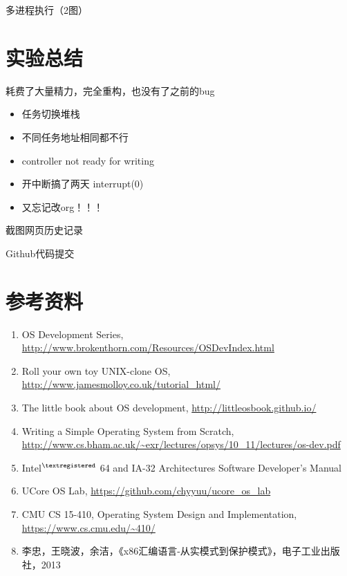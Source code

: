 \documentclass[logo,reportComp]{thesis}
\begin{document}
多进程执行（2图）

\section{实验总结}
耗费了大量精力，完全重构，也没有了之前的bug

\begin{itemize}
\item 任务切换堆栈
\item 不同任务地址相同都不行
\item controller not ready for writing
\item 开中断搞了两天 interrupt(0)
\item 又忘记改org！！！
\end{itemize}

截图网页历史记录

Github代码提交

\section{参考资料}
\begin{enumerate}
	\item OS Development Series, \url{http://www.brokenthorn.com/Resources/OSDevIndex.html}
	\item Roll your own toy UNIX-clone OS, \url{http://www.jamesmolloy.co.uk/tutorial_html/}
	\item The little book about OS development, \url{http://littleosbook.github.io/}
	\item Writing a Simple Operating System from Scratch, \url{http://www.cs.bham.ac.uk/~exr/lectures/opsys/10_11/lectures/os-dev.pdf}
	\item Intel$^{\textregistered}$ 64 and IA-32 Architectures Software Developer's Manual
	\item UCore OS Lab, \url{https://github.com/chyyuu/ucore_os_lab}
	\item CMU CS 15-410, Operating System Design and Implementation, \url{https://www.cs.cmu.edu/~410/}
	\item 李忠，王晓波，余洁，《x86汇编语言-从实模式到保护模式》，电子工业出版社，2013
\end{enumerate}
\end{document}
